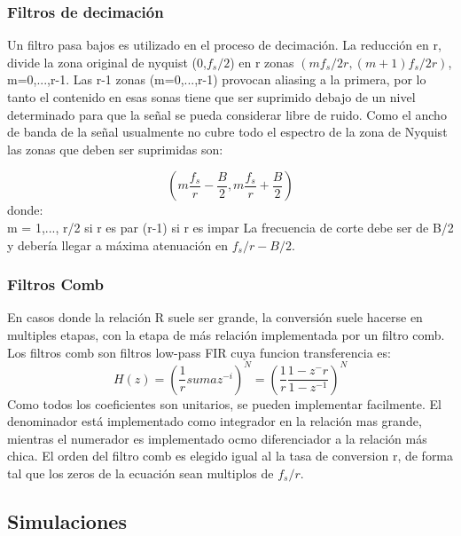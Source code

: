 \documentclass[assd_tp3_main.tex]{subfiles}
\begin{document}
\subsubsection{Filtros de decimación}
Un filtro pasa bajos es utilizado en el proceso de decimación. La reducción en r, divide la zona original de nyquist (0,$f_s/2$) en r zonas $(mf_s/2r,(m+1)f_s/2r)$, m=0,...,r-1. Las r-1 zonas (m=0,...,r-1) provocan aliasing a la primera, por lo tanto el contenido en esas sonas tiene que ser suprimido debajo de un nivel determinado para que la señal se pueda considerar libre de ruido. Como el ancho de banda de la señal usualmente no cubre todo el espectro de la zona de Nyquist las zonas que deben ser suprimidas son:

\[ (m\frac{f_s}{r}-\frac{B}{2},m\frac{f_s}{r}+\frac{B}{2}) \]
donde:\\
m = 1,...,
r/2 si r es par
(r-1) si r es impar 
La frecuencia de corte debe ser de B/2 y debería llegar a máxima atenuación en $f_s/r-B/2$.
\subsubsection{Filtros Comb}
En casos donde la relación R suele ser grande, la conversión suele hacerse en multiples etapas, con la etapa de más relación implementada por un filtro comb.
Los filtros comb son filtros low-pass FIR cuya funcion transferencia es:
\[ H(z)=(\frac{1}{r}suma z^{-i})^N=(\frac{1}{r}\frac{1-z^-{r}}{1-z^{-1}})^N \]
Como todos los coeficientes son unitarios, se pueden implementar facilmente.
El denominador está implementado como integrador en la relación mas grande, mientras el numerador es implementado ocmo diferenciador a la relación más chica. El orden del filtro comb es elegido igual al la tasa de conversion r, de forma tal que los zeros de la ecuación sean multiplos de $f_s/r$.
\subsection{Simulaciones}
\end{document}
